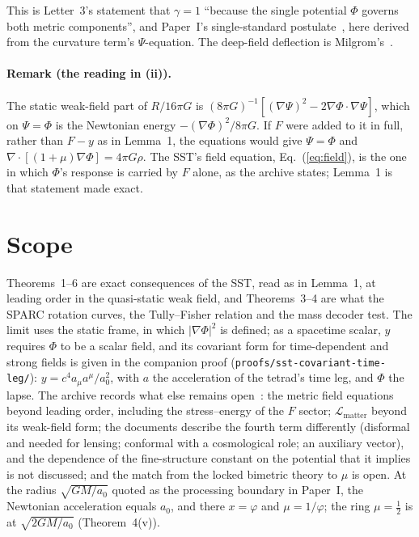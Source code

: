 \documentclass[twocolumn]{iopjournal}
\begin{document}
\medskip
\noindent
This is Letter~3's statement that $\gamma = 1$ ``because the single
potential $\Phi$ governs both metric components'', and Paper~I's
single-standard postulate~\cite{NelsonI}, here derived from the
curvature term's $\Psi$-equation. The deep-field deflection is
Milgrom's~\cite{Milgrom1983}.

\paragraph{Remark (the reading in (ii)).} The static weak-field part of
$R/16\pi G$ is $(8\pi G)^{-1}[(\nabla\Psi)^2 - 2\nabla\Phi\cdot\nabla\Psi]$,
which on $\Psi = \Phi$ is the Newtonian energy $-(\nabla\Phi)^2/8\pi G$.
If $F$ were added to it in full, rather than $F - y$ as in Lemma~1, the
equations would give $\Psi = \Phi$ and $\nabla\cdot[(1+\mu)\nabla\Phi]
= 4\pi G\rho$. The SST's field equation, Eq.~(\ref{eq:field}), is the
one in which $\Phi$'s response is carried by $F$ alone, as the archive
states; Lemma~1 is that statement made exact.


\section*{Scope}

Theorems~1--6 are exact consequences of the SST, read as in Lemma~1, at
leading order in the quasi-static weak field, and Theorems~3--4 are
what the SPARC rotation curves, the Tully--Fisher relation and the mass
decoder test. The limit uses the static frame, in which $|\nabla\Phi|^2$
is defined; as a spacetime scalar, $y$ requires $\Phi$ to be a scalar
field, and its covariant form for time-dependent and strong fields is
given in the companion proof (\texttt{proofs/sst-covariant-time-leg/}):
$y = c^4a_\mu a^\mu/a_0^2$, with $a$ the acceleration of the tetrad's
time leg, and $\Phi$ the lapse. The archive records what else remains open~\cite{NelsonColes}:
the metric field equations beyond leading order, including the
stress--energy of the $F$ sector; $\mathcal L_{\mathrm{matter}}$ beyond
its weak-field form; the documents describe the fourth term
differently (disformal and needed for lensing; conformal with a
cosmological role; an auxiliary vector), and the dependence of the
fine-structure constant on the potential that it implies is not
discussed; and the match from the locked bimetric theory to $\mu$ is
open. At the radius $\sqrt{GM/a_0}$ quoted as the processing boundary in
Paper~I, the Newtonian acceleration equals $a_0$, and there
$x = \varphi$ and $\mu = 1/\varphi$; the ring $\mu = \tfrac12$ is at
$\sqrt{2GM/a_0}$ (Theorem~4(v)).
\end{document}

